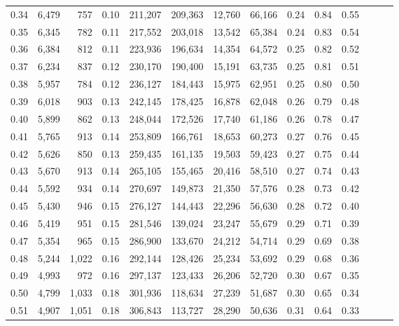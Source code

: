 \begin{tabular}{rrrrrrrrrrrrrr}
0.34 &   6,479 &    757 &  0.10 &  211,207 &  209,363 &  12,760 &  66,166 &  0.24 &  0.84 &      0.55 \\
0.35 &   6,345 &    782 &  0.11 &  217,552 &  203,018 &  13,542 &  65,384 &  0.24 &  0.83 &      0.54 \\
0.36 &   6,384 &    812 &  0.11 &  223,936 &  196,634 &  14,354 &  64,572 &  0.25 &  0.82 &      0.52 \\
0.37 &   6,234 &    837 &  0.12 &  230,170 &  190,400 &  15,191 &  63,735 &  0.25 &  0.81 &      0.51 \\
0.38 &   5,957 &    784 &  0.12 &  236,127 &  184,443 &  15,975 &  62,951 &  0.25 &  0.80 &      0.50 \\
0.39 &   6,018 &    903 &  0.13 &  242,145 &  178,425 &  16,878 &  62,048 &  0.26 &  0.79 &      0.48 \\
0.40 &   5,899 &    862 &  0.13 &  248,044 &  172,526 &  17,740 &  61,186 &  0.26 &  0.78 &      0.47 \\
0.41 &   5,765 &    913 &  0.14 &  253,809 &  166,761 &  18,653 &  60,273 &  0.27 &  0.76 &      0.45 \\
0.42 &   5,626 &    850 &  0.13 &  259,435 &  161,135 &  19,503 &  59,423 &  0.27 &  0.75 &      0.44 \\
0.43 &   5,670 &    913 &  0.14 &  265,105 &  155,465 &  20,416 &  58,510 &  0.27 &  0.74 &      0.43 \\
0.44 &   5,592 &    934 &  0.14 &  270,697 &  149,873 &  21,350 &  57,576 &  0.28 &  0.73 &      0.42 \\
0.45 &   5,430 &    946 &  0.15 &  276,127 &  144,443 &  22,296 &  56,630 &  0.28 &  0.72 &      0.40 \\
0.46 &   5,419 &    951 &  0.15 &  281,546 &  139,024 &  23,247 &  55,679 &  0.29 &  0.71 &      0.39 \\
0.47 &   5,354 &    965 &  0.15 &  286,900 &  133,670 &  24,212 &  54,714 &  0.29 &  0.69 &      0.38 \\
0.48 &   5,244 &  1,022 &  0.16 &  292,144 &  128,426 &  25,234 &  53,692 &  0.29 &  0.68 &      0.36 \\
0.49 &   4,993 &    972 &  0.16 &  297,137 &  123,433 &  26,206 &  52,720 &  0.30 &  0.67 &      0.35 \\
0.50 &   4,799 &  1,033 &  0.18 &  301,936 &  118,634 &  27,239 &  51,687 &  0.30 &  0.65 &      0.34 \\
0.51 &   4,907 &  1,051 &  0.18 &  306,843 &  113,727 &  28,290 &  50,636 &  0.31 &  0.64 &      0.33 \\

\end{tabular}
